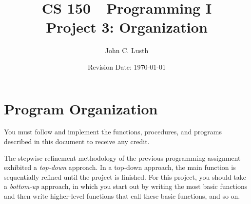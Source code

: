 \documentclass{article}
\title{CS 150~~Programming I\\
Project 3: Organization}
\author{John C. Lusth}
\date{Revision Date: \today}
\begin{document}
\maketitle

\thispagestyle{empty}

\W\subsubsection*{}
\W\htmlrule

\section*{Program Organization}

You must follow and implement the functions, procedures,
and programs described in
this document to receive any credit.

The stepwise refinement methodology of the previous programming assignment
exhibited a {\it top-down} approach.  In a top-down approach, the main
function is sequentially refined until the project is finished. For this
project, you should take a {\it bottom-up} approach, in which you start
out by writing the most basic functions and then write higher-level
functions that call these basic functions, and so on.
\end{document}
